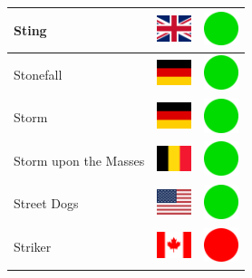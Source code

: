 \documentclass[12pt, a4paper, twoside]{report}
\begin{document}
\begin{center}
\begin{longtable}{|p{5cm}|p{2cm}|p{2cm}|}
 Sting                                                      & \includegraphics[width=1cm]{../img/flags/gb} &   \includegraphics[width=1cm]{../likes/y} \\ \hline
 Stonefall                                                  & \includegraphics[width=1cm]{../img/flags/de} &   \includegraphics[width=1cm]{../likes/y} \\ \hline
 Storm                                                      & \includegraphics[width=1cm]{../img/flags/de} &   \includegraphics[width=1cm]{../likes/y} \\ \hline
 Storm upon the Masses                                      & \includegraphics[width=1cm]{../img/flags/be} &   \includegraphics[width=1cm]{../likes/y} \\ \hline
 Street Dogs                                                & \includegraphics[width=1cm]{../img/flags/us} &   \includegraphics[width=1cm]{../likes/y} \\ \hline
 Striker                                                    & \includegraphics[width=1cm]{../img/flags/ca} &   \includegraphics[width=1cm]{../likes/n} \\ \hline

\end{longtable}
\end{center}
\end{document}

